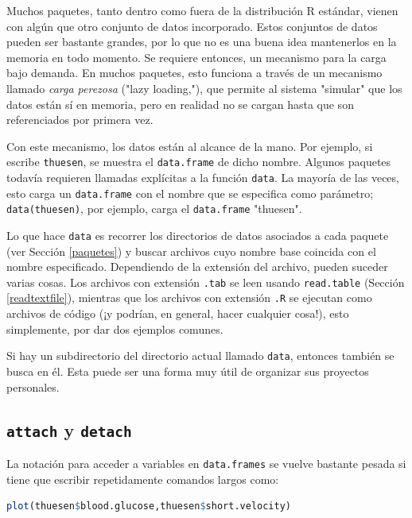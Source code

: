 \documentclass[spanish]{extbook}
\numberwithin{equation}{section}
\numberwithin{figure}{section}
\begin{document}
Muchos paquetes, tanto dentro como fuera de la distribución R estándar, vienen
con algún que otro conjunto de datos incorporado. Estos conjuntos de datos
pueden ser bastante grandes, por lo que no es una buena idea mantenerlos en la
memoria en todo momento. Se requiere entonces, un mecanismo para la carga bajo
demanda. En muchos paquetes, esto funciona a través de un mecanismo llamado
\textit{carga perezosa} ("lazy loading,"), que permite al sistema "simular" que
los datos están sí  en memoria, pero en realidad no se cargan hasta que son
referenciados por primera vez.  

Con este mecanismo, los datos están al alcance de la mano. Por ejemplo, si
escribe \texttt{thuesen}, se muestra el \texttt{data.frame} de dicho nombre.
Algunos paquetes todavía requieren llamadas explícitas a la función
\texttt{data}.  La mayoría de las veces, esto carga un \texttt{data.frame} con
el nombre que se especifica como parámetro; \texttt{data(thuesen)}, por
ejemplo, carga el \texttt{data.frame} "thuesen".

Lo que hace \texttt{data} es recorrer los directorios de datos asociados a cada
paquete (ver Sección \ref{paquetes}) y buscar archivos cuyo nombre base
coincida con el nombre especificado. Dependiendo de la extensión del archivo,
pueden suceder varias cosas. Los archivos con extensión \texttt{.tab} se leen
usando \texttt{read.table} (Sección \ref{readtextfile}), mientras que los
archivos con extensión \texttt{.R} se ejecutan como archivos de código (¡y
podrían, en general, hacer cualquier cosa!), esto simplemente, por dar dos
ejemplos comunes.

Si hay un subdirectorio del directorio actual llamado \texttt{data}, entonces
también se busca en él. Esta puede ser una forma muy útil de organizar sus
proyectos personales.

\subsection{\texttt{attach} y \texttt{detach}}\label{attachdetach}

La notación para acceder a variables en \texttt{data.frames} se vuelve bastante pesada
si tiene que escribir repetidamente comandos largos como:

\begin{lstlisting}[language=R]
plot(thuesen$blood.glucose,thuesen$short.velocity)
\end{lstlisting}
\end{document}
